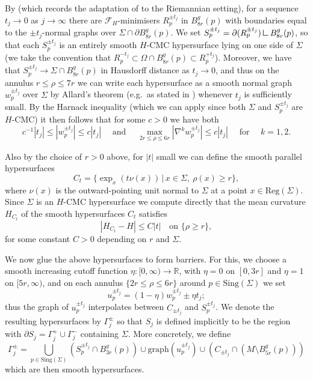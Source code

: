 \documentclass[12pt]{article}
\newcommand{\mres}{\mathbin{\vrule height 1.6ex depth 0pt width
0.13ex\vrule height 0.13ex depth 0pt width 1.3ex}}
\begin{document}
By \cite[Theorem 8.7]{L23} (which records the adaptation of \cite[Theorem 2]{BL25} to the Riemannian setting), for a sequence $t_j \rightarrow 0$ as $j \rightarrow \infty$ there are $\mathcal{F}_H$-minimisers $R_p^{\pm t_j}$ in $B_{8r}^g(p)$ with boundaries  equal to the $\pm t_j$-normal graphs over $\Sigma\cap\partial B_{8r}^g(p)$. We set $S_p^{\pm t_j} = \partial(R_p^{\pm t_j} )\mres B_{8r}^g(p)$, so that each $S_p^{\pm t_j}$ is an entirely smooth $H$-CMC hypersurface lying on one side of $\Sigma$ (we take the convention that $R^{-t_j}_p \subset \Omega \cap B_{8r}^g(p) \subset R^{+t_j}_p$). Moreover, we have that $S_p^{\pm t_j}\rightarrow \Sigma\cap B_{8r}^g(p)$ in Hausdorff distance as $t_j \rightarrow 0$, and thus on the annulus $r\leq \rho \leq 7r$ we can write each hypersurface as a smooth normal graph $w_p^{\pm t_j}$ over $\Sigma$ by Allard's theorem (e.g.~as stated in \cite[Chapter 5]{S83A}) whenever $t_j$ is sufficiently small. By the Harnack inequality (which we can apply since both $\Sigma$ and $S_p^{\pm t_j}$ are $H$-CMC) it then follows that for some $c > 0$ we have both
    $$
          c^{-1}|t_j|\le |w_p^{\pm t_j}|\le c|t_j| \quad \text{ and } \quad
            \max_{2r \leq \rho \leq 6r}|\nabla^k w_p^{\pm t_j}|
            \le c|t_j| \quad \text{ for }
            \quad k=1,2 .
    $$
    
Also by the choice of $r > 0$ above, for $|t|$ small we can define the smooth parallel hypersurfaces
    $$
            C_t
            =
            \{\exp_x(t\nu(x)) \, | \, x\in \Sigma,\ \rho(x)\ge r\},
    $$
where $\nu(x)$ is the outward-pointing unit normal to $\Sigma$ at a point $x \in \mathrm{Reg}(\Sigma)$. Since $\Sigma$ is an $H$-CMC hypersurface we compute directly that the mean curvature $H_{C_t}$ of the smooth hypersurfaces $C_t$ satisfies
    $$
            |H_{C_t}-H|\le C|t|
            \quad\text{on }\{\rho\ge r\},
    $$
for some constant $C > 0$ depending on $r$ and $\Sigma$.

\bigskip
    
We now glue the above hypersurfaces to form barriers. For this, we choose a smooth increasing cutoff function $\eta: [0,\infty) \rightarrow \mathbb{R}$, with $\eta = 0$
 on $[0,3r]$ and $\eta = 1$ on $[5r,\infty)$, and on each annulus $\{2r \leq \rho \leq 6r\}$ around $p \in \mathrm{Sing}(\Sigma)$ we set
    $$
            u_p^{\pm t_j}
            =
            (1-\eta)w_p^{\pm t_j} \pm \eta t_j;
    $$
    thus the graph of $u_p^{\pm t_j}$ interpolates between $C_{\pm t_j}$ and $S_p^{\pm t_j}$. We denote the resulting hypersurfaces by $\Gamma_j^{\pm}$ so that $S_j$ is defined implicitly to be the region with $\partial S_j = \Gamma_j^+ \cup \Gamma_j^-$ containing $\Sigma$. More concretely, we define
    $$
    \Gamma_j^{\pm} = \bigcup_{p \in \mathrm{Sing}(\Sigma)}(S_p^{\pm t_j} \cap B_{3r}^g(p)) \cup \mathrm{graph}(u_p^{\pm t_j}) \cup (C_{\pm t_j} \cap (M \setminus B_{5r}^g(p)))
    $$
    which are then smooth hypersurfaces. 
    
\end{document}
